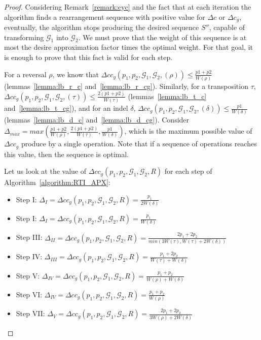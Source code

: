 \documentclass[12pt]{article}
\begin{document}
\begin{proof}
Considering Remark~\ref{remark:cyc} and the fact that at each iteration the algorithm finds a rearrangement sequence with positive value for $\Delta c$ or $\Delta c_g$, eventually, the algorithm stops producing the desired sequence $S''$, capable of transforming $\mathcal{G}_1$ into $\mathcal{G}_2$. We must prove that the weight of this sequence is at most the desire approximation factor times the optimal weight. For that goal, it is enough to prove that this fact is valid for each step.

For a reversal $\rho$, we know that $\Delta c c_g(p_1,p_2,\mathcal{G}_1,\mathcal{G}_2,(\rho)) \le \frac{p1+p2}{W(\rho)}$ (lemmas~\ref{lemma:lb_r_c} and~\ref{lemma:lb_r_cg}). Similarly, for a transposition $\tau$, $\Delta c c_g(p_1,p_2,\mathcal{G}_1,\mathcal{G}_2,(\tau)) \le \frac{2(p1+p2)}{W(\tau)}$ (lemmas~\ref{lemma:lb_t_c} and~\ref{lemma:lb_t_cg}), and for an indel $\delta$, $\Delta c c_g(p_1,p_2,\mathcal{G}_1,\mathcal{G}_2,(\delta)) \le \frac{p1}{W(\delta)}$ (lemmas~\ref{lemma:lb_d_c} and~\ref{lemma:lb_d_cg}). Consider $\Delta_{max} = max  \left (\frac{p1+p2}{W(\rho)}, \frac{2(p1+p2)}{W(\tau)}, \frac{p1}{W(\delta)} \right )$, which is the maximum possible value of $\Delta c c_g$ produce by a single operation. Note that if a sequence of operations reaches this value, then the sequence is optimal.

Let us look at the value of $\Delta cc_g(p_1,p_2,\mathcal{G}_1,\mathcal{G}_2,R)$ for each step of Algorithm~\ref{algorithm:RTI_APX}:
\begin{itemize}
    \item Step I: $\Delta_I=\Delta cc_g(p_1,p_2,\mathcal{G}_1,\mathcal{G}_2,R) = \frac{p_1}{2W(\delta)}$
    \item Step I: $\Delta_I=\Delta cc_g(p_1,p_2,\mathcal{G}_1,\mathcal{G}_2,R) = \frac{p_1}{W(\delta)}$
    \item Step III: $\Delta_{II}=\Delta cc_g(p_1,p_2,\mathcal{G}_1,\mathcal{G}_2,R) = \frac{2p_1 + 2p_2}{min(3W(\tau),W(\tau) + 2W(\delta))}$
    \item Step IV: $\Delta_{III}=\Delta cc_g(p_1,p_2,\mathcal{G}_1,\mathcal{G}_2,R) = \frac{p_1 + 2p_2}{W(\tau) + W(\delta)}$
    \item Step V: $\Delta_{IV}=\Delta cc_g(p_1,p_2,\mathcal{G}_1,\mathcal{G}_2,R) = \frac{p_1 + p_2}{W(\rho) + W(\delta)}$
    \item Step VI: $\Delta_{IV}=\Delta cc_g(p_1,p_2,\mathcal{G}_1,\mathcal{G}_2,R) = \frac{p_1 + p_2}{W(\rho)}$
    \item Step VII: $\Delta_V=\Delta cc_g(p_1,p_2,\mathcal{G}_1,\mathcal{G}_2,R) = \frac{2p_1 + 2p_2}{3W(\rho) + 2W(\delta)}$
\end{itemize}


\end{proof}
\end{document}
